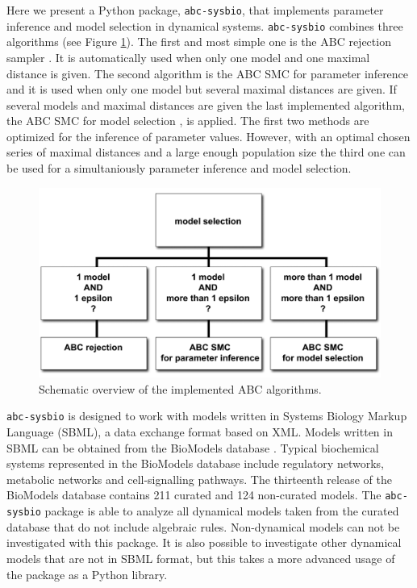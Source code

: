 \documentclass[a4paper]{report}
\begin{document}
Here we present a Python package, \verb$abc-sysbio$, that implements parameter inference and model selection in dynamical systems. \verb$abc-sysbio$ combines three algorithms (see Figure \ref{abcAlgorithms}). The first and most simple one is the ABC rejection sampler \citep{ABCrejection}. It is automatically used when only one model and one maximal distance is given. The second algorithm is the ABC SMC for parameter inference \citep{Toni2009} and it is used when only one model but several maximal distances are given. If several models and maximal distances are given the last implemented algorithm, the ABC SMC for model selection \citep{Toni2009}, is applied. The first two methods are optimized for the inference of parameter values. However, with an optimal chosen series of maximal distances and a large enough population size the third one can be used for a simultaniously parameter inference and model selection.

\begin{figure}
\begin{center}
\includegraphics[width=1.0\textwidth]{Graphics/abcAlgorithms.png}
\caption{
{\bf } Schematic overview of the implemented ABC algorithms.
}
\label{abcAlgorithms}
\end{center}
\end{figure}

\verb$abc-sysbio$ is designed to work with models written in Systems Biology Markup Language (SBML), a data exchange format based on XML. Models written in SBML can be obtained from the BioModels database \citep{LeNovere2006}. Typical biochemical systems represented in the BioModels database include regulatory networks, metabolic networks and cell-signalling pathways. The thirteenth release of the BioModels database contains 211 curated and 124 non-curated models. The \verb$abc-sysbio$ package is able to analyze all dynamical models taken from the curated database that do not include algebraic rules. Non-dynamical models can not be investigated with this package. It is also possible to investigate other dynamical models that are not in SBML format, but this takes a more advanced usage of the package as a Python library.
\end{document}
